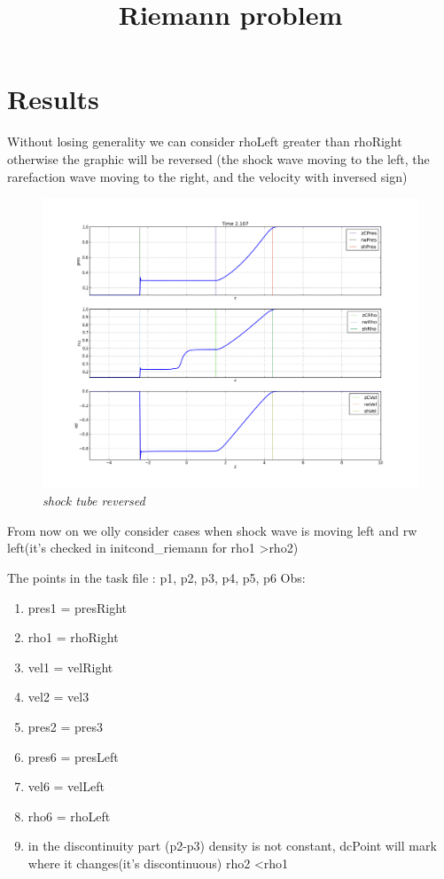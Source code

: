 \documentclass[12pt]{book}
\title{Riemann problem}
\date{}
\begin{document}
\section*{Results}

Without losing generality we can consider rhoLeft greater than rhoRight otherwise the graphic will be reversed 
(the shock wave moving to the left, the rarefaction wave moving to the right, and the velocity with inversed sign)

\begin{figure}[!h]
 \centering
 \includegraphics[scale=0.4]{reverse.png}
	\caption{\emph{shock tube reversed}}
 \label{Fig: 1}
\end{figure}

From now on we olly consider cases when shock wave is moving left and rw left(it's checked in initcond\_riemann for rho1 \textgreater rho2) 

The points in the task file : p1, p2, p3, p4, p5, p6
Obs:
\begin{enumerate}
	\item pres1 = presRight
	\item rho1 = rhoRight
	\item vel1 = velRight
	\item vel2 = vel3
	\item pres2 = pres3
	\item pres6 = presLeft
	\item vel6 = velLeft
	\item rho6 = rhoLeft
	\item in the discontinuity part (p2-p3) density is not constant, dcPoint will mark where it changes(it's discontinuous) rho2 \textless rho1
	
\end{enumerate}
\end{document}
